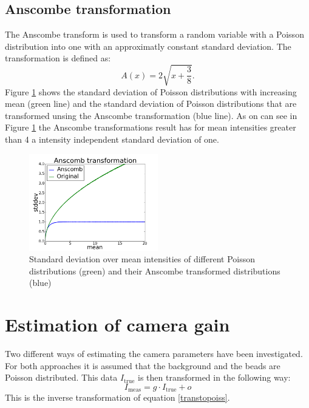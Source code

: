 \subsection{Anscombe transformation}
\label{trafoAnscombe}
The Anscombe transform \cite{anscombe} is used to transform a random variable with a Poisson
distribution into one with an approximatly constant standard deviation. The
transformation is defined as:
\begin{equation}
	A(x) = 2\sqrt{x+\frac{3}{8}}.
\end{equation}
Figure \ref{anscombe} shows the standard deviation of Poisson distributions with increasing mean (green line) and the standard deviation of Poisson distributions that are transformed unsing the Anscombe transformation (blue line). As on can see in Figure \ref{anscombe} the Anscombe transformations result has
for mean intensities greater than 4 a intensity independent standard deviation of
one.
\begin{figure}
	\centering
	\includegraphics[width = 0.5\textwidth]{pictures/anscombe.png}
	\caption{Standard deviation over mean intensities of different Poisson
	distributions (green) and their Anscombe transformed distributions (blue)}
	\label{anscombe}
	
\end{figure}

\section{Estimation of camera gain}
Two different ways of estimating the camera parameters have been investigated. For both approaches it is assumed that the background and the beads are Poisson distributed. This data $I_\text{true}$ is then transformed in the following way:
\begin{equation}
	I_\text{meas} = g \cdot I_\text{true} + o \label{trafoGain}
\end{equation}
This is the inverse transformation of equation \ref{transtopoiss}.
